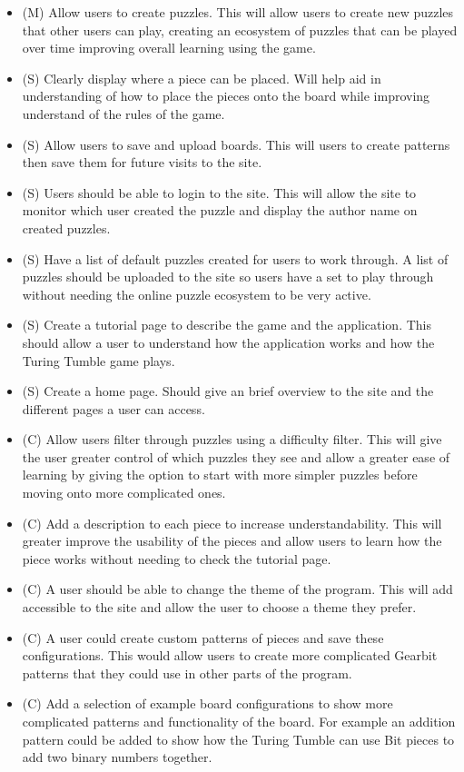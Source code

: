 \documentclass{l4proj}
\begin{document}
\begin{itemize}
    \item (M) Allow users to create puzzles. This will allow users to create new puzzles that other users can play, creating an ecosystem of puzzles that can be played over time improving overall learning using the game.
    \item (S) Clearly display where a piece can be placed. Will help aid in understanding of how to place the pieces onto the board while improving understand of the rules of the game. 
    \item (S) Allow users to save and upload boards. This will users to create patterns then save them for future visits to the site.
    \item (S) Users should be able to login to the site. This will allow the site to monitor which user created the puzzle and display the author name on created puzzles. 
    \item (S) Have a list of default puzzles created for users to work through. A list of puzzles should be uploaded to the site so users have a set to play through without needing the online puzzle ecosystem to be very active.
    \item (S) Create a tutorial page to describe the game and the application. This should allow a user to understand how the application works and how the Turing Tumble game plays.
    \item (S) Create a home page. Should give an brief overview to the site and the different pages a user can access.
    \item (C) Allow users filter through puzzles using a difficulty filter. This will give the user greater control of which puzzles they see and allow a greater ease of learning by giving the option to start with more simpler puzzles before moving onto more complicated ones.
    \item (C) Add a description to each piece to increase understandability. This will greater improve the usability of the pieces and allow users to learn how the piece works without needing to check the tutorial page. 
    \item (C) A user should be able to change the theme of the program. This will add accessible to the site and allow the user to choose a theme they prefer.
    \item (C) A user could create custom patterns of pieces and save these configurations. This would allow users to create more complicated Gearbit patterns that they could use in other parts of the program. 
    \item (C) Add a selection of example board configurations to show more complicated patterns and functionality of the board. For example an addition pattern could be added to show how the Turing Tumble can use Bit pieces to add two binary numbers together.

\end{itemize}
\end{document}
